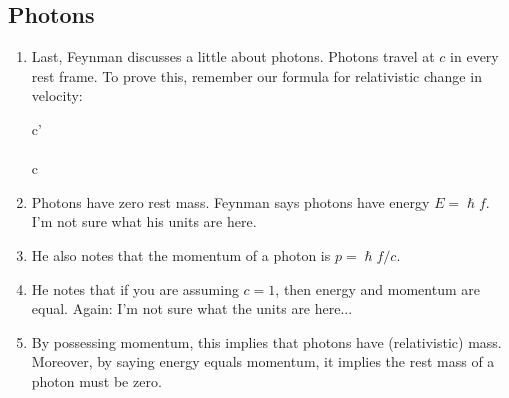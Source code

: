 \subsection{Photons}

\begin{enumerate}

  \item Last, Feynman discusses a little about photons. Photons travel
  at $c$ in every rest frame. To prove this, remember our formula for
  relativistic change in velocity:

  \begin{nedqn}
    c'
  \eqcol
  \\
  \eqcol
  \\
  \eqcol
    c
  \end{nedqn}

  \item Photons have zero rest mass. Feynman says photons have energy $E
  = \hslash f$. I'm not sure what his units are here.

  \item He also notes that the momentum of a photon is $p = \hslash f /
  c$.

  \item He notes that if you are assuming $c = 1$, then energy and
  momentum are equal. Again: I'm not sure what the units are here...

  \item By possessing momentum, this implies that photons have
  (relativistic) mass. Moreover, by saying energy equals momentum, it
  implies the rest mass of a photon must be zero.

\end{enumerate}
